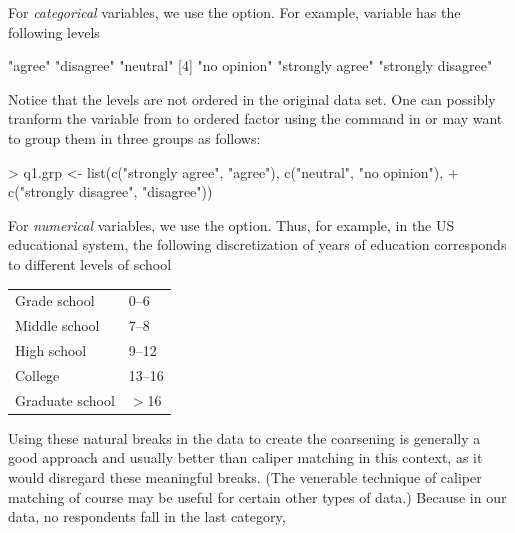 \documentclass[article]{jss}
\begin{document}
For \emph{categorical} variables, we use the  option.
For example, variable  has the following levels
\begin{Schunk}
\begin{Soutput}
[1] "agree"             "disagree"          "neutral"          
[4] "no opinion"        "strongly agree"    "strongly disagree"
\end{Soutput}
\end{Schunk}
Notice that the levels are not ordered in the original data set. One can possibly tranform the variable  from  to ordered factor using the command  in  or
may want to group them in three groups as follows: 
\begin{Schunk}
\begin{Sinput}
> q1.grp <- list(c("strongly agree", "agree"), c("neutral", "no opinion"), 
+     c("strongly disagree", "disagree"))
\end{Sinput}
\end{Schunk}
For \emph{numerical} variables, we use the  option.
Thus, for example, in the US educational system, the following
discretization of years of education corresponds to different levels
of school
\begin{center}
\begin{tabular}{ll}
Grade school    & 0--6\\
Middle school   & 7--8\\
High school     & 9--12\\
College         & 13--16\\
Graduate school & $>$16 
\end{tabular}
\end{center}
Using these natural breaks in the data to create the coarsening is
generally a good approach and usually better than caliper matching in
this context, as it would disregard these meaningful breaks.  (The
venerable technique of caliper matching of course may be useful for
certain other types of data.)  Because in our data, no respondents
fall in the last category,
\end{document}
